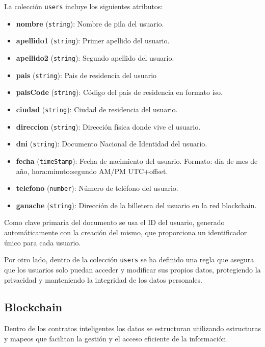 La colección \texttt{users} incluye los siguientes atributos:
\begin{itemize}
 	\item \textbf{nombre} (\texttt{string}): Nombre de pila del usuario.
    \item \textbf{apellido1} (\texttt{string}): Primer apellido del
     usuario.
    \item \textbf{apellido2} (\texttt{string}): Segundo apellido del
     usuario.
    \item \textbf{pais} (\texttt{string}): Pais de residencia del usuario
    \item \textbf{paisCode} (\texttt{string}): Código del país de
     residencia en formato iso.
    \item \textbf{ciudad} (\texttt{string}): Ciudad de residencia del
     usuario.
    \item \textbf{direccion} (\texttt{string}): Dirección física donde vive
     el usuario.
    \item \textbf{dni} (\texttt{string}): Documento Nacional de Identidad
     del usuario.
    \item \textbf{fecha} (\texttt{timeStamp}): Fecha de nacimiento del
     usuario. Formato: día de mes de año, hora:minuto:segundo AM/PM
     UTC+offset.
    \item \textbf{telefono} (\texttt{number}): Número de teléfono del
     usuario.
    \item \textbf{ganache} (\texttt{string}): Dirección de la billetera del
     usuario en la red blockchain.


\end{itemize}

Como clave primaria del documento se usa el ID del usuario, generado automáticamente con la creación del mismo, que proporciona un identificador único para cada usuario.

Por otro lado, dentro de la colección \texttt{users} se ha definido una regla que asegura que los usuarios solo puedan acceder y modificar sus propios datos, protegiendo la privacidad y manteniendo la integridad de los datos personales.



\subsection{Blockchain}

Dentro de los contratos inteligentes los datos se estructuran utilizando estructuras y mapeos que facilitan la gestión y el acceso eficiente de la información. 

